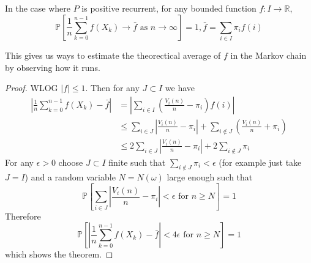 \begin{corollary}
    In the case where $P$ is positive recurrent, for any bounded function $f:I\to\mathbb R$,
    $$\mathbb P\left[ \frac{1}{n}\sum_{k=0}^{n-1}f(X_k)\to\bar{f}\text{ as }n\to\infty\right]=1,\bar{f}=\sum_{i\in I}\pi_if(i)$$
\end{corollary}
This gives us ways to estimate the theorectical average of $f$ in the Markov chain by observing how it runs.
\begin{proof}
    WLOG $|f|\le 1$.
    Then for any $J\subset I$ we have
    \begin{align*}
        \left|\frac{1}{n}\sum_{k=0}^{n-1}f(X_k)-\bar f\right|&=\left|\sum_{i\in I}\left( \frac{V_i(n)}{n}-\pi_i \right) f(i)\right|\\
        &\le \sum_{i\in J}\left|\frac{V_i(n)}{n}-\pi_i\right|+\sum_{i\notin J}\left( \frac{V_i(n)}{n}+\pi_i \right)\\
        &\le 2\sum_{i\in J}\left|\frac{V_i(n)}{n}-\pi_i\right|+2\sum_{i\notin J}\pi_i
    \end{align*}
    For any $\epsilon>0$ choose $J\subset I$ finite such that $\sum_{i\notin J}\pi_i<\epsilon$ (for example just take $J=I$) and a random variable $N=N(\omega)$ large enough such that
    $$\mathbb P\left[ \sum_{i\in J}\left|\frac{V_i(n)}{n}-\pi_i\right|<\epsilon\text{ for }n\ge N \right]=1$$
    Therefore
    $$\mathbb P\left[ \left|\frac{1}{n}\sum_{k=0}^{n-1}f(X_k)-\bar f\right|<4\epsilon\text{ for }n\ge N \right]=1$$
    which shows the theorem.
\end{proof}